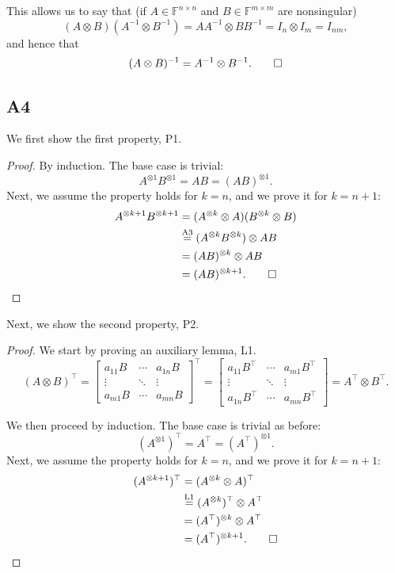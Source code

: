 \documentclass[11pt]{article}
\newcommand{\field}{\mathbb{F}} %
\newcommand{\kp}{\otimes} %
\begin{document}
This allows us to say that (if \(A \in \field^{n \times n}\) and \(B \in \field^{m \times m}\) are nonsingular)
\[
(A \kp B)(A^{-1} \kp B^{-1}) = AA^{-1} \kp BB^{-1} = I_n \kp I_m = I_{nm},
\]
and hence that
\[
(A \kp B)^{-1} = A^{-1} \kp B^{-1}.\qedhere
\]

\subsection*{A4}
We first show the first property, P1.
\begin{proof}
By induction.
The base case is trivial:
\[
A^{\kp 1} B^{\kp 1} = AB = (AB)^{\kp 1}.
\]
Next, we assume the property holds for \(k = n\), and we prove it for \(k = n+1\):
\begin{align*}
A^{\kp k+1} B^{\kp k+1} &= (A^{\kp k} \kp A) (B^{\kp k} \kp B)\\
&\overset{\textnormal{A3}}{=}(A^{\kp k} B^{\kp k}) \kp AB\\
&= (AB)^{\kp k} \kp AB\\
&= (AB)^{\kp k+1}.\qedhere
\end{align*}
\end{proof}

Next, we show the second property, P2.
\begin{proof}
We start by proving an auxiliary lemma, L1.
\[
(A \kp B)^\top = \begin{bmatrix}
a_{11} B & \cdots & a_{1n}B \\
\vdots & \ddots & \vdots \\
a_{m1} B & \cdots & a_{mn} B
\end{bmatrix}^\top = \begin{bmatrix}
a_{11} B^\top & \cdots & a_{m1}B^\top \\
\vdots & \ddots & \vdots \\
a_{1n} B^\top & \cdots & a_{mn} B^\top
\end{bmatrix} = A^\top \kp B^\top.
\]

We then proceed by induction.
The base case is trivial as before:
\[
(A^{\kp 1})^\top = A^\top = (A^\top)^{\kp 1}.
\]
Next, we assume the property holds for \(k = n\), and we prove it for \(k = n+1\):
\begin{align*}
(A^{\kp k+1})^\top &= (A^{\kp k} \kp A)^\top\\
&\overset{\textnormal{L1}}{=} (A^{\kp k})^\top \kp A^\top\\
&= (A^\top)^{\kp k} \kp A^\top\\
&= (A^\top)^{\kp k+1}.\qedhere
\end{align*}
\end{proof}
\end{document}

